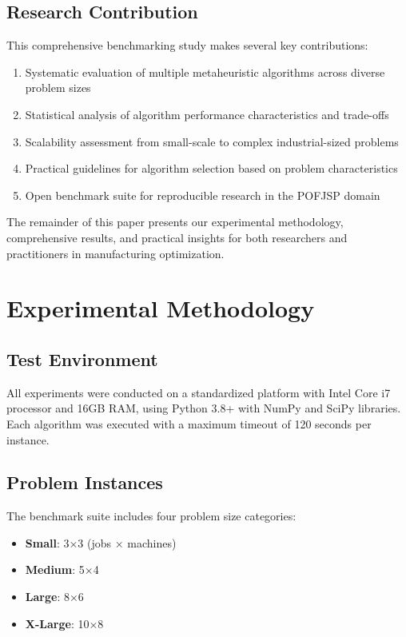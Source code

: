 \documentclass[11pt,twocolumn]{article}
\begin{document}
\subsection{Research Contribution}

This comprehensive benchmarking study makes several key contributions:

\begin{enumerate}
    \item Systematic evaluation of multiple metaheuristic algorithms across diverse problem sizes
    \item Statistical analysis of algorithm performance characteristics and trade-offs
    \item Scalability assessment from small-scale to complex industrial-sized problems
    \item Practical guidelines for algorithm selection based on problem characteristics
    \item Open benchmark suite for reproducible research in the POFJSP domain
\end{enumerate}

The remainder of this paper presents our experimental methodology, comprehensive results, and practical insights for both researchers and practitioners in manufacturing optimization.


\section{Experimental Methodology}

\subsection{Test Environment}
All experiments were conducted on a standardized platform with Intel Core i7 processor and 16GB RAM, using Python 3.8+ with NumPy and SciPy libraries. Each algorithm was executed with a maximum timeout of 120 seconds per instance.

\subsection{Problem Instances}
The benchmark suite includes four problem size categories:
\begin{itemize}
    \item \textbf{Small}: 3×3 (jobs × machines)
    \item \textbf{Medium}: 5×4
    \item \textbf{Large}: 8×6  
    \item \textbf{X-Large}: 10×8
\end{itemize}
\end{document}
